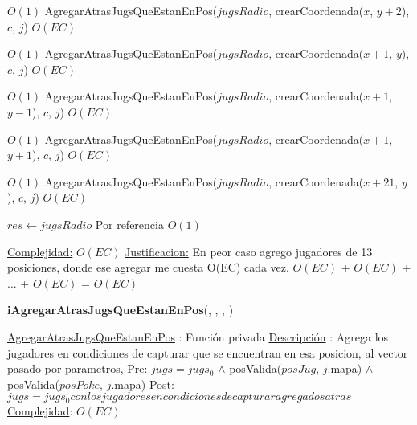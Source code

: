 \begin{Algoritmos}
\begin{algorithmic}[1]
             \Comment $O(1)$
            \State AgregarAtrasJugsQueEstanEnPos($jugsRadio$, crearCoordenada($x$, $y+2$), $c$, $j$)    \Comment $O(EC)$
        \EndIf


    \EndIf

\EndIf

         \Comment $O(1)$
        \State AgregarAtrasJugsQueEstanEnPos($jugsRadio$, crearCoordenada($x+1$, $y$), $c$, $j$)    \Comment $O(EC)$
    \EndIf

             \Comment $O(1)$
            \State AgregarAtrasJugsQueEstanEnPos($jugsRadio$, crearCoordenada($x+1$, $y-1$), $c$, $j$)    \Comment $O(EC)$
        \EndIf
    \EndIf

             \Comment $O(1)$
            \State AgregarAtrasJugsQueEstanEnPos($jugsRadio$, crearCoordenada($x+1$, $y+1$), $c$, $j$)    \Comment $O(EC)$
        \EndIf

    \EndIf
\EndIf

         \Comment $O(1)$
        \State AgregarAtrasJugsQueEstanEnPos($jugsRadio$, crearCoordenada($x+21$, $y$), $c$, $j$)    \Comment $O(EC)$
    \EndIf
\EndIf

\State $res \gets jugsRadio$ \Comment Por referencia $O(1)$

\medskip
\State \underline{Complejidad:} $O(EC)$ %
\State \underline{Justificacion:} En peor caso agrego jugadores de 13 posiciones, donde ese agregar me cuesta O(EC) cada vez. $O(EC)$ + $O(EC)$ + ... + $O(EC)$ = $O(EC)$ 

\end{algorithmic}


  



\begin{algorithm}[H]
{\textbf{iAgregarAtrasJugsQueEstanEnPos}(, , , )}
\begin{algorithmic}[1]

\Statex \underline{AgregarAtrasJugsQueEstanEnPos} : Funci\'on privada 
\Statex \underline{Descripci\'on} : Agrega los jugadores en condiciones de capturar que se encuentran en esa posicion, al vector pasado por parametros,   
\Statex \underline{Pre}: $jugs = jugs_0$ $\land$  posValida($posJug$, $j$.mapa) $\land$ posValida($posPoke$, $j$.mapa)
\Statex \underline{Post}: $jugs = jugs_0 con los jugadores en condiciones de capturar agregados atras$
\Statex \underline{Complejidad}: $O(EC)$ 


\end{algorithmic}
\end{algorithm}
\end{Algoritmos}
